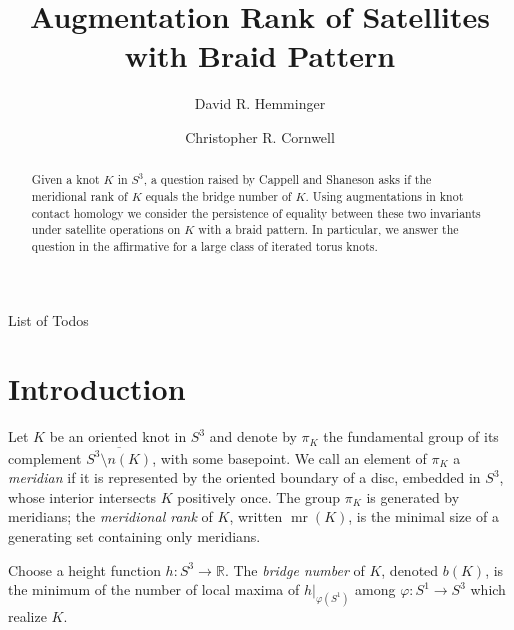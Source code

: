 \documentclass[11pt]{amsart}
\makeatletter
\def\R{{\mathbb R}}
\def\mr{\operatorname{mr}}
\theoremstyle{definition}
\def\listtodoname{List of Todos}
\def\listoftodos{\@starttoc{tdo}\listtodoname}
\makeatother
\begin{document}
\listoftodos
\newpage





\title{Augmentation Rank of Satellites with Braid Pattern}

\author{David R. Hemminger}
\author{Christopher R. Cornwell}

\begin{abstract}
Given a knot $K$ in $S^3$, a question raised by Cappell and Shaneson asks if the meridional rank of $K$ equals the bridge number of $K$. Using augmentations in knot contact homology we consider the persistence of equality between these two invariants under satellite operations on $K$ with a braid pattern. In particular, we answer the question in the affirmative for a large class of iterated torus knots.
\end{abstract}

\maketitle

\section{Introduction}
Let $K$ be an oriented knot in $S^3$ and denote by $\pi_K$ the fundamental group of its complement $\overline{S^3\setminus n(K)}$, with some basepoint. We call an element of $\pi_K$ a \emph{meridian} if it is represented by the oriented boundary of a disc, embedded in $S^3$, whose interior intersects $K$ positively once. The group $\pi_K$ is generated by meridians; the \emph{meridional rank} of $K$, written $\mr(K)$, is the minimal size of a generating set containing only meridians. 

Choose a height function $h:S^3\to\R$. The \emph{bridge number} of $K$, denoted $b(K)$, is the minimum of the number of local maxima of $h|_{\varphi(S^1)}$ among $\varphi:S^1\to S^3$ which realize $K$. %
\end{document}
